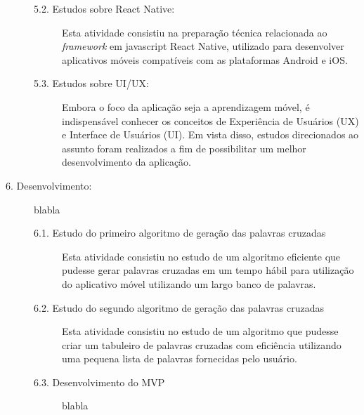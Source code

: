 \begin{description}
\begin{description}
\item[5.2. Estudos sobre React Native:] Esta atividade consistiu na preparação técnica relacionada ao \textit{framework} em javascript React Native, utilizado para desenvolver aplicativos móveis compatíveis com as plataformas Android e iOS.

\item[5.3. Estudos sobre UI/UX:] Embora o foco da aplicação seja a aprendizagem móvel, é indispensável conhecer os conceitos de Experiência de Usuários (UX) e Interface de Usuários (UI). Em vista disso, estudos direcionados ao assunto foram realizados a fim de possibilitar um melhor desenvolvimento da aplicação.

\end{description}

\item[6. Desenvolvimento:]
blabla

\begin{description}
    \item[6.1. Estudo do primeiro algoritmo de geração das palavras cruzadas]
    Esta atividade consistiu no estudo de um algoritmo eficiente que pudesse gerar palavras cruzadas em um tempo hábil para utilização do aplicativo móvel utilizando um largo banco de palavras.
    
    \item[6.2. Estudo do segundo algoritmo de geração das palavras cruzadas]
    Esta atividade consistiu no estudo de um algoritmo que pudesse criar um tabuleiro de palavras cruzadas com eficiência utilizando uma pequena lista de palavras fornecidas pelo usuário.
    
    \item[6.3. Desenvolvimento do MVP] blabla
\end{description}

\end{description}